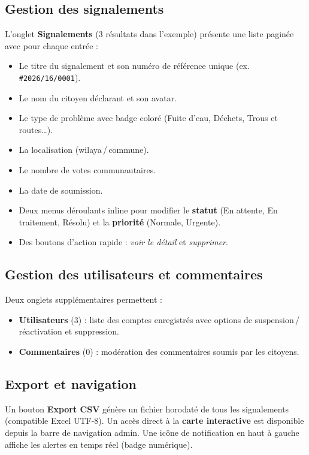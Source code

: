 \documentclass[12pt,a4paper]{report}
\begin{document}
\subsection{Gestion des signalements}
L'onglet \textbf{Signalements} (3 résultats dans l'exemple) présente une liste
paginée avec pour chaque entrée :
\begin{itemize}
  \item Le titre du signalement et son numéro de référence unique (ex.
        \texttt{\#2026/16/0001}).
  \item Le nom du citoyen déclarant et son avatar.
  \item Le type de problème avec badge coloré (Fuite d'eau, Déchets, Trous et
        routes\ldots).
  \item La localisation (wilaya\,/\,commune).
  \item Le nombre de votes communautaires.
  \item La date de soumission.
  \item Deux menus déroulants inline pour modifier le \textbf{statut} (En
        attente, En traitement, Résolu) et la \textbf{priorité} (Normale,
        Urgente).
  \item Des boutons d'action rapide : \textit{voir le détail} et
        \textit{supprimer}.
\end{itemize}

\subsection{Gestion des utilisateurs et commentaires}
Deux onglets supplémentaires permettent :
\begin{itemize}
  \item \textbf{Utilisateurs} (3) : liste des comptes enregistrés avec options
        de suspension\,/\,réactivation et suppression.
  \item \textbf{Commentaires} (0) : modération des commentaires soumis par les
        citoyens.
\end{itemize}

\subsection{Export et navigation}
Un bouton \textbf{Export CSV} génère un fichier horodaté de tous les
signalements (compatible Excel UTF-8). Un accès direct à la \textbf{carte
interactive} est disponible depuis la barre de navigation admin. Une icône de
notification en haut à gauche affiche les alertes en temps réel (badge
numérique).
\end{document}
